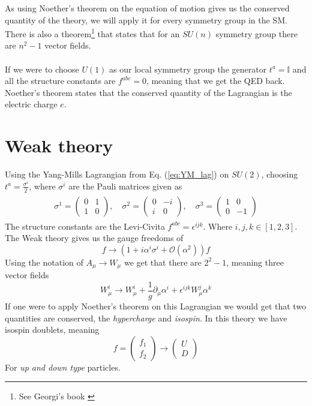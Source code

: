 \documentclass[12pt, a4paper]{book}
\begin{document}
As using Noether's theorem on the equation of motion gives us the conserved quantity of the theory, we will apply it for every symmetry group in the SM. There is also a theorem\footnote{See Georgi's book \cite{Georgi:1982jb}} that states that for an $SU(n)$ symmetry group there are $n^2-1$ vector fields.\\
\\If we were to choose $U(1)$ as our local symmetry group the generator $t^a = \mathbb{I}$ and all the structure constants are $f^{abc}=0$, meaning that we get the QED back. 
Noether's theorem states that the conserved quantity of the Lagrangian is the electric charge $e$.


\section{Weak theory}
Using the Yang-Mills Lagrangian from Eq. (\ref{eq:YM_lag}) on $SU(2)$, choosing $t^a =\frac{\sigma^i}{2}$, where $\sigma^i$ are the Pauli matrices given as 
\begin{align}\label{eq:Pauli}
    \begin{split}
        \sigma ^{1}={\begin{pmatrix}0&1\\1&0\end{pmatrix}},\quad 
        \sigma ^{2}={\begin{pmatrix}0&-i\\i&0\end{pmatrix}},\quad 
        \sigma ^{3}={\begin{pmatrix}1&0\\0&-1\end{pmatrix}}
    \end{split}
\end{align} 
The structure constants are the Levi-Civita $f^{abc}=\epsilon^{ijk}$. Where $i,j,k\in[1,2,3]$.
The Weak theory gives us the gauge freedoms of
$$
f \rightarrow \left(1+i \alpha^i \sigma^i + \mathcal{O}(\alpha^2)\right) f
$$ 
Using the notation of $A_\mu\rightarrow W_\mu$ we get that there are $2^2-1$, meaning three vector fields 
$$
W_\mu^i \rightarrow W^i_\mu +\frac{1}{g}\partial_\mu\alpha^i +\epsilon^{ijk}W_\mu^j\alpha^k
$$
If one were to apply Noether's theorem on this Lagrangian we would get that two quantities are conserved, the \textit{hypercharge} and \textit{isospin}. In this theory we have isospin doublets, meaning 
$$
f=\begin{pmatrix}
    f_1\\f_2
\end{pmatrix}
\rightarrow \begin{pmatrix}
    U\\D
\end{pmatrix}
$$
For \textit{up and down type} particles.
\end{document}
